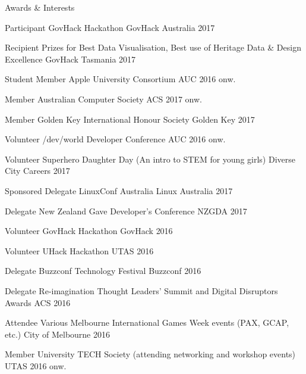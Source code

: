 \begin{tmrsection}{Awards \& Interests}


\tmrcolumnentry
  	{Participant}
    {GovHack Hackathon}
    {GovHack Australia}
    {2017}

\tmrcolumnentry
  	{Recipient}
  	{Prizes for Best Data Visualisation, Best use of Heritage Data \& Design Excellence}
  	{GovHack Tasmania}
  	{2017}


\tmrcolumnentry
    {Student Member}
    {Apple University Consortium}
    {AUC}
    {2016 onw.}

\tmrcolumnentry
    {Member}
    {Australian Computer Society}
    {ACS}
    {2017 onw.}
    
\tmrcolumnentry
  	{Member}
  	{Golden Key International Honour Society}
  	{Golden Key}
  	{2017}


\tmrcolumnentry
    {Volunteer}
    {/dev/world Developer Conference}
    {AUC}
    {2016 onw.}

\tmrcolumnentry
    {Volunteer}
    {Superhero Daughter Day (An intro to STEM for young girls)}
    {Diverse City Careers}
    {2017}

\tmrcolumnentry
    {Sponsored Delegate}
    {LinuxConf Australia}
    {Linux Australia}
    {2017}

\tmrcolumnentry
  	{Delegate}
  	{New Zealand Gave Developer's Conference}
  	{NZGDA}
  	{2017}

\tmrcolumnentry
    {Volunteer}
    {GovHack Hackathon}
    {GovHack}
    {2016}

\tmrcolumnentry
	{Volunteer}
	{UHack Hackathon}
	{UTAS}
	{2016}

\tmrcolumnentry
    {Delegate}
    {Buzzconf Technology Festival}
    {Buzzconf}
    {2016}

\tmrcolumnentry
    {Delegate}
    {Re-imagination Thought Leaders' Summit and Digital Disruptors Awards}
    {ACS}
    {2016}
    
\tmrcolumnentry
    {Attendee}
    {Various Melbourne International Games Week events (PAX, GCAP, etc.)}
    {City of Melbourne}
    {2016}
    

\tmrcolumnentry
    {Member}
    {University TECH Society (attending networking and workshop events)}
    {UTAS}
    {2016 onw.}
    

\end{tmrsection}
